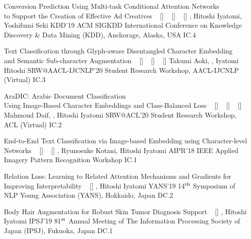 \begin{publications}
    \publication
    {Conversion Prediction Using Multi-task Conditional Attention Networks \\ to Support the Creation of Effective Ad Creatives}
    {
    ~ [\href{https://dl.acm.org/doi/10.1145/3292500.3330789}{\small{\linkSymbol}}]
    ~ [\href{https://arxiv.org/abs/1905.07289}{\small{\arxivSymbol}}]
    ~ [\href{https://github.com/shunk031/Multi-task-Conditional-Attention-Networks}{\small{\githubSymbol}}]
    }
    {\underline{}, Hitoshi Iyatomi, Yoshifumi Seki}
    {KDD'19} {ACM SIGKDD International Conference on Knowledge Discovery \& Data Mining (KDD), Anchorage, Alaska, USA} {IC.4}

    \publication
    {Text Classification through Glyph-aware Disentangled Character Embedding \\ and Semantic Sub-character Augmentation}
    {
    ~ [\href{https://aclanthology.org/2020.aacl-srw.1/}{\small{\linkSymbol}}]
    ~ [\href{https://arxiv.org/abs/2011.04184}{\small{\arxivSymbol}}]
    ~ [\href{https://github.com/IyatomiLab/GDCE-SSA}{\small{\githubSymbol}}]
    }
    {Takumi Aoki, \underline{}, Iyatomi Hitoshi}
    {SRW@AACL-IJCNLP'20} {Student Research Workshop, AACL-IJCNLP (Virtual)} {IC.3}

    \publication
    {AraDIC: Arabic Document Classification \\ Using Image-Based Character Embeddings and Class-Balanced Loss}
    {
    ~ [\href{https://aclanthology.org/2020.acl-srw.29/}{\small{\linkSymbol}}]
    ~ [\href{https://arxiv.org/abs/2006.11586}{\small{\arxivSymbol}}]
    ~ [\href{https://github.com/IyatomiLab/GDCE-SSA}{\small{\githubSymbol}}]
    }
    {Mahmoud Daif, \underline{}, Hitoshi Iyatomi}
    {SRW@ACL'20} {Student Research Workshop, ACL (Virtual)} {IC.2}

    \publication
    {End-to-End Text Classification via Image-based Embedding using Character-level Networks}
    {
    ~ [\href{https://ieeexplore.ieee.org/document/8707407}{\small{\linkSymbol}}]
    ~ [\href{https://arxiv.org/abs/1810.03595}{\small{\arxivSymbol}}]
    }
    {\underline{}, Ryunosuke Kotani, Hitoshi Iyatomi}
    {AIPR'18} {IEEE Applied Imagery Pattern Recognition Workshop} {IC.1}

    \publication
    {Relation Loss: Learning to Related Attention Mechanisms and Gradients for Improving Interpretability}
    {
    ~ [\href{https://www.hosei.ac.jp/gs/NEWS/zaigaku/koganei/20190920/}{\small{\linkSymbol}}]
    }
    {\underline{}, Hitoshi Iyatomi}
    {YANS'19} {14$^{\textrm{\scriptsize th}}$ Symposium of NLP Young Association (YANS), Hokkaido, Japan} {DC.2}

    \publication
    {Body Hair Augmentation for Robust Skin Tumor Diagnosis Support}
    {
    ~ [\href{https://www.hosei.ac.jp/gs/NEWS/topics/jusho/190411_4/}{\small{\linkSymbol}}]
    }
    {\underline{}, Hitoshi Iyatomi}
    {IPSJ'19} {81$^{\textrm{\scriptsize st}}$ Annual Meeting of The Information Processing Society of Japan (IPSJ), Fukuoka, Japan} {DC.1}

\end{publications}
